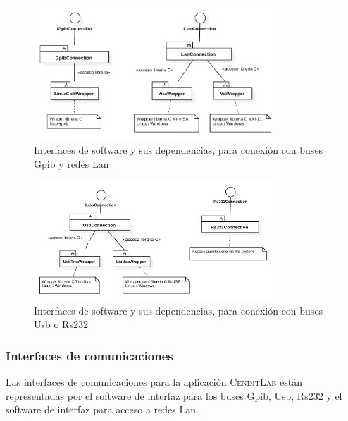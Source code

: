 \documentclass[paper=a4,oneside,fontsize=12pt]{article}
\newcommand{\AppName}{\textsc{CenditLab}\xspace}
\begin{document}
	\begin{figure}[H]
		\centering
		\includegraphics[width=0.8\textwidth]{Imagenes/CommunicationAbstractionLayerPackages2.pdf}
		\caption{Interfaces de software y sus dependencias, para conexión con buses Gpib y redes Lan}
		\label{Fig:CalPackages1}
	\end{figure}

	\begin{figure}[H]
		\centering
		\includegraphics[width=0.8\textwidth]{Imagenes/CommunicationAbstractionLayerPackages3.pdf}
		\caption{Interfaces de software y sus dependencias, para conexión con buses Usb o Rs232}
		\label{Fig:CalPackages2}		
	\end{figure}
	
	\subsubsection{Interfaces de comunicaciones}
	
	Las interfaces de comunicaciones para la aplicación \AppName están representadas por el software de interfaz para los buses Gpib, Usb, Rs232 y el software de interfaz para acceso a redes Lan.
	
\end{document}
